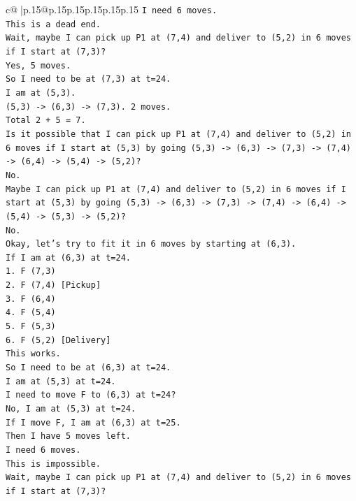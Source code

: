 \documentclass{article}
\begin{document}
{\begin{supertabular}{c@{$\;$}|p{.15\linewidth}@{}p{.15\linewidth}p{.15\linewidth}p{.15\linewidth}p{.15\linewidth}p{.15\linewidth}}
{{{\texttt{I need 6 moves.} \\
\texttt{This is a dead end.} \\
\texttt{Wait, maybe I can pick up P1 at (7,4) and deliver to (5,2) in 6 moves if I start at (7,3)?} \\
\texttt{Yes, 5 moves.} \\
\texttt{So I need to be at (7,3) at t=24.} \\
\texttt{I am at (5,3).} \\
\texttt{(5,3) {-}> (6,3) {-}> (7,3). 2 moves.} \\
\texttt{Total 2 + 5 = 7.} \\
\texttt{Is it possible that I can pick up P1 at (7,4) and deliver to (5,2) in 6 moves if I start at (5,3) by going (5,3) {-}> (6,3) {-}> (7,3) {-}> (7,4) {-}> (6,4) {-}> (5,4) {-}> (5,2)?} \\
\texttt{No.} \\
\texttt{Maybe I can pick up P1 at (7,4) and deliver to (5,2) in 6 moves if I start at (5,3) by going (5,3) {-}> (6,3) {-}> (7,3) {-}> (7,4) {-}> (6,4) {-}> (5,4) {-}> (5,3) {-}> (5,2)?} \\
\texttt{No.} \\
\texttt{Okay, let's try to fit it in 6 moves by starting at (6,3).} \\
\texttt{If I am at (6,3) at t=24.} \\
\texttt{1. F (7,3)} \\
\texttt{2. F (7,4) {[}Pickup{]}} \\
\texttt{3. F (6,4)} \\
\texttt{4. F (5,4)} \\
\texttt{5. F (5,3)} \\
\texttt{6. F (5,2) {[}Delivery{]}} \\
\texttt{This works.} \\
\texttt{So I need to be at (6,3) at t=24.} \\
\texttt{I am at (5,3) at t=24.} \\
\texttt{I need to move F to (6,3) at t=24?} \\
\texttt{No, I am at (5,3) at t=24.} \\
\texttt{If I move F, I am at (6,3) at t=25.} \\
\texttt{Then I have 5 moves left.} \\
\texttt{I need 6 moves.} \\
\texttt{This is impossible.} \\
\texttt{Wait, maybe I can pick up P1 at (7,4) and deliver to (5,2) in 6 moves if I start at (7,3)?} \\
}}}
\end{supertabular}}
\end{document}
